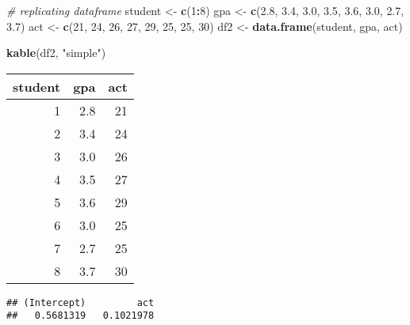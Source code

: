 \documentclass[
]{article}
\newenvironment{Shaded}{\begin{snugshade}}{\end{snugshade}}
\newcommand{\CommentTok}[1]{\textcolor[rgb]{0.56,0.35,0.01}{\textit{#1}}}
\newcommand{\DataTypeTok}[1]{\textcolor[rgb]{0.13,0.29,0.53}{#1}}
\newcommand{\DecValTok}[1]{\textcolor[rgb]{0.00,0.00,0.81}{#1}}
\newcommand{\FloatTok}[1]{\textcolor[rgb]{0.00,0.00,0.81}{#1}}
\newcommand{\KeywordTok}[1]{\textcolor[rgb]{0.13,0.29,0.53}{\textbf{#1}}}
\newcommand{\NormalTok}[1]{#1}
\newcommand{\OperatorTok}[1]{\textcolor[rgb]{0.81,0.36,0.00}{\textbf{#1}}}
\newcommand{\StringTok}[1]{\textcolor[rgb]{0.31,0.60,0.02}{#1}}
\begin{document}
\begin{Shaded}
\begin{Highlighting}[]
\CommentTok{# replicating dataframe }
\NormalTok{student <-}\StringTok{ }\KeywordTok{c}\NormalTok{(}\DecValTok{1}\OperatorTok{:}\DecValTok{8}\NormalTok{)}
\NormalTok{gpa <-}\StringTok{ }\KeywordTok{c}\NormalTok{(}\FloatTok{2.8}\NormalTok{, }\FloatTok{3.4}\NormalTok{, }\FloatTok{3.0}\NormalTok{, }\FloatTok{3.5}\NormalTok{, }\FloatTok{3.6}\NormalTok{, }\FloatTok{3.0}\NormalTok{, }\FloatTok{2.7}\NormalTok{, }\FloatTok{3.7}\NormalTok{) }
\NormalTok{act <-}\StringTok{ }\KeywordTok{c}\NormalTok{(}\DecValTok{21}\NormalTok{, }\DecValTok{24}\NormalTok{, }\DecValTok{26}\NormalTok{, }\DecValTok{27}\NormalTok{, }\DecValTok{29}\NormalTok{, }\DecValTok{25}\NormalTok{, }\DecValTok{25}\NormalTok{, }\DecValTok{30}\NormalTok{)}
\NormalTok{df2 <-}\StringTok{ }\KeywordTok{data.frame}\NormalTok{(student, gpa, act)}
\end{Highlighting}
\end{Shaded}

\begin{Shaded}
\begin{Highlighting}[]
\KeywordTok{kable}\NormalTok{(df2, }\StringTok{"simple"}\NormalTok{)}
\end{Highlighting}
\end{Shaded}

\begin{longtable}[]{@{}rrr@{}}
\toprule
student & gpa & act\tabularnewline
\midrule
\endhead
1 & 2.8 & 21\tabularnewline
2 & 3.4 & 24\tabularnewline
3 & 3.0 & 26\tabularnewline
4 & 3.5 & 27\tabularnewline
5 & 3.6 & 29\tabularnewline
6 & 3.0 & 25\tabularnewline
7 & 2.7 & 25\tabularnewline
8 & 3.7 & 30\tabularnewline
\bottomrule
\end{longtable}

\begin{Shaded}
\end{Shaded}

\begin{verbatim}
## (Intercept)         act 
##   0.5681319   0.1021978
\end{verbatim}
\end{document}
